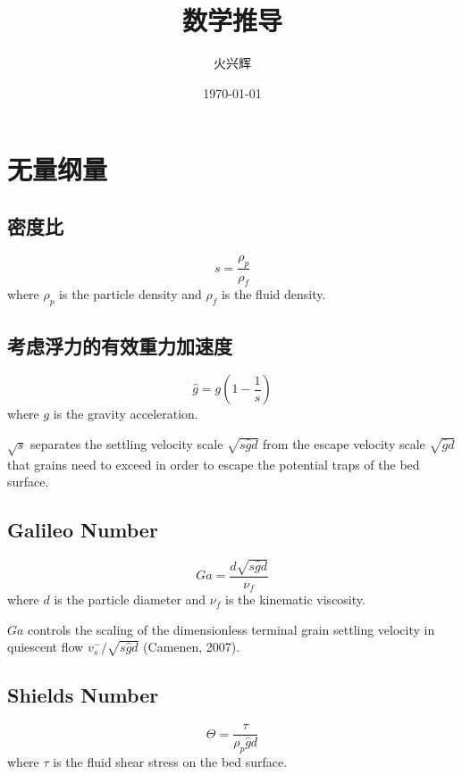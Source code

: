 \documentclass[12pt,a4paper]{article}
\title{数学推导}
\author{火兴辉}
\date{\today}
\begin{document}
\maketitle

\section{无量纲量}

\subsection{密度比}
\begin{equation}
    s = \frac{\rho_p}{\rho_f}
\end{equation}
where $\rho_p$ is the particle density and $\rho_f$ is the fluid density.

\subsection{考虑浮力的有效重力加速度}
\begin{equation}
    \hat{g} = g(1-\frac{1}{s})
\end{equation}
where $g$ is the gravity acceleration.

$\sqrt{s}$ separates the settling velocity scale $\sqrt{s \hat{g} d}$ from the escape velocity scale $\sqrt{\hat{g} d}$ that grains need to exceed in order to escape the potential traps of the bed surface.

\subsection{Galileo Number}
\begin{equation}
    Ga = \frac{d \sqrt{s \hat{g} d}}{\nu_f}
\end{equation}
where $d$ is the particle diameter and $\nu_f$ is the kinematic viscosity.

$Ga$ controls the scaling of the dimensionless terminal grain settling velocity in quiescent flow $v_s^-/\sqrt{s \hat{g} d}$ (Camenen, 2007). 

\subsection{Shields Number}
\begin{equation}
    \Theta = \frac{\tau}{\rho_p \hat{g} d}
\end{equation}
where $\tau$ is the fluid shear stress on the bed surface.
\end{document}

